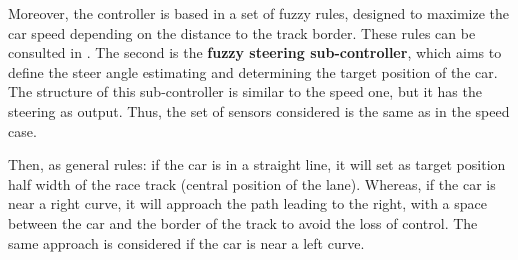 \documentclass[conference]{IEEEtran}
\begin{document}
Moreover, the controller is based in a set of fuzzy rules, designed to maximize the car speed depending on the distance to the track border. These rules can be consulted in \cite{salem_evo17}.
%
%
%
%
%
%
%
The second is the \textbf{fuzzy steering sub-controller}, which aims to define the steer angle estimating and determining the target position of the car. 
%
The structure of this sub-controller is similar to the speed one, but it has the steering as output. Thus, the set of sensors considered is the same as in the speed case.

Then, as general rules: if the car is in a straight line, it will set as target position half width of the race track (central position of the lane). Whereas, if the car is near a right curve, it will approach the path leading to the right, with a space between the car and the border of the track to avoid the loss of control. The same approach is considered if the car is near a left curve.
\end{document}
